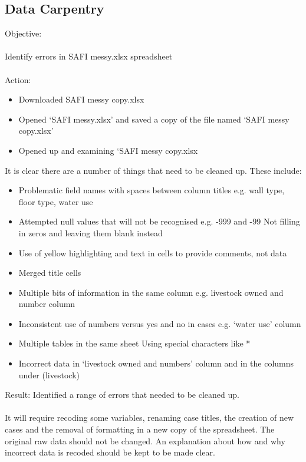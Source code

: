 \documentclass{article}
\begin{document}
\subsection*{Data Carpentry}
Objective:\\
\\Identify errors in SAFI messy.xlsx spreadsheet\\
\\
Action:
\begin{itemize}
\item Downloaded SAFI messy copy.xlsx
\item Opened ‘SAFI messy.xlsx’ and saved a copy of the file named ‘SAFI messy copy.xlsx’
\item Opened up and examining ‘SAFI messy copy.xlsx
\end{itemize}
It is clear there are a number of things that need to be cleaned up. These include:\par
\begin{itemize}
\item Problematic field names with spaces between column titles e.g. wall type, floor type, water use
\item Attempted null values that will not be recognised e.g. -999 and -99 
Not filling in zeros and leaving them blank instead
\item Use of yellow highlighting and text in cells to provide comments, not data
\item Merged title cells
\item Multiple bits of information in the same column e.g. livestock owned and number column
\item Inconsistent use of numbers versus yes and no in cases e.g. ‘water use’ column
\item Multiple tables in the same sheet
Using special characters like *
\item Incorrect data in ‘livestock owned and numbers’ column and in the columns under (livestock)
\end{itemize}
Result: Identified a range of errors that needed to be cleaned up.\\
\\
It will require recoding some variables, renaming case titles, the creation of new cases and the removal of formatting in a new copy of the spreadsheet. The original raw data should not be changed. An explanation about how and why incorrect data is recoded should be kept to be made clear.\\
\\
\end{document}
